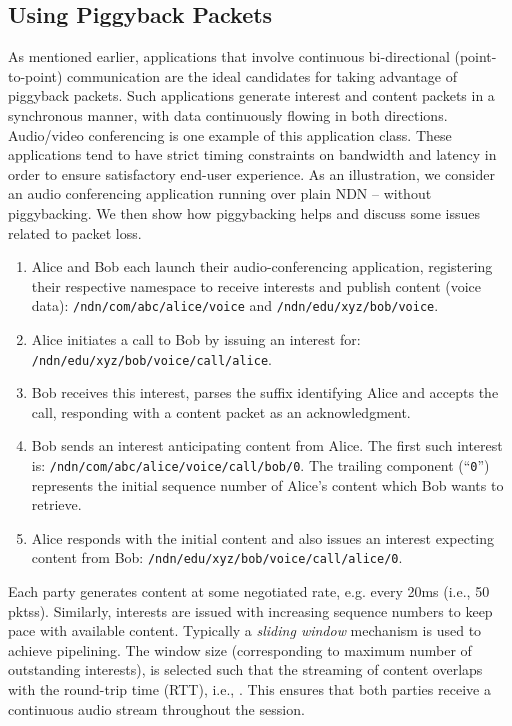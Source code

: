 \documentclass[conference]{IEEEtran}
\begin{document}
\subsection{Using Piggyback Packets}
\label{sec:design-usingpiggyback}
As mentioned earlier, applications that involve continuous bi-directional (point-to-point) 
communication are the ideal candidates for taking advantage of piggyback packets. Such 
applications generate interest and content packets in a synchronous manner, 
with data continuously flowing in both directions. Audio/video conferencing is 
one example of this application class. 
These applications tend to have strict timing constraints on bandwidth and latency in order to
ensure satisfactory end-user experience. As an illustration, we consider an audio 
conferencing application running over plain NDN -- without piggybacking. We then show 
how piggybacking helps and discuss some issues related to packet loss.
\begin{enumerate}
\item Alice and Bob each launch their audio-conferencing application, registering their respective 
namespace to receive interests and publish content (voice data): \verb|/ndn/com/abc/alice/voice| and 
\verb|/ndn/edu/xyz/bob/voice|.
\item Alice initiates a call to Bob by issuing an interest for: \verb|/ndn/edu/xyz/bob/voice/call/alice|.
\item Bob receives this interest, parses the suffix identifying Alice and accepts the call, 
responding with a content packet as an acknowledgment.
\item Bob sends an interest anticipating content from Alice. The first such interest is: 
\verb|/ndn/com/abc/alice/voice/call/bob/0|. The trailing component (``\verb|0|'') represents
the initial sequence number of Alice's content which Bob wants to retrieve. 
\item Alice responds with the initial content and also issues an interest expecting 
content from Bob: \verb|/ndn/edu/xyz/bob/voice/call/alice/0|.
\end{enumerate}
Each party generates content at some negotiated rate, e.g. every 20ms (i.e.,  50 pktss).
Similarly, 
interests are issued with increasing sequence numbers to keep pace with available content. 
Typically a {\em sliding window} mechanism is used to achieve pipelining. 
The window size  (corresponding to maximum number of outstanding interests), 
is selected such that the streaming of content overlaps with the round-trip time (RTT), i.e., 
.  This ensures that both parties receive a continuous 
audio stream throughout the session. 
\end{document}
